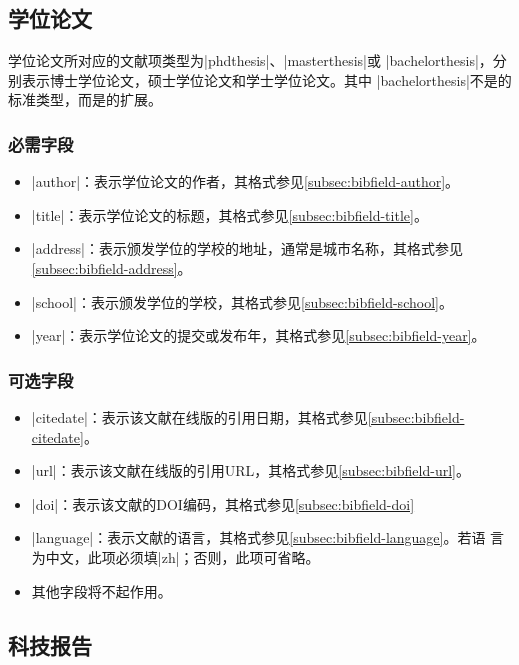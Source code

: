 \subsection{学位论文}\label{subsec:bibtype-thesis}

学位论文所对应的{\BibTeX}文献项类型为|phdthesis|、|masterthesis|或
|bachelorthesis|，分别表示博士学位论文，硕士学位论文和学士学位论文。其中
|bachelorthesis|不是{\BibTeX}的标准类型，而是{\njuthesis}的扩展。

\subsubsection{必需字段}

\begin{itemize}
\item |author|：表示学位论文的作者，其格式参见\ref{subsec:bibfield-author}。
\item |title|：表示学位论文的标题，其格式参见\ref{subsec:bibfield-title}。
\item |address|：表示颁发学位的学校的地址，通常是城市名称，其格式参见\ref{subsec:bibfield-address}。
\item |school|：表示颁发学位的学校，其格式参见\ref{subsec:bibfield-school}。
\item |year|：表示学位论文的提交或发布年，其格式参见\ref{subsec:bibfield-year}。
\end{itemize}

\subsubsection{可选字段}

\begin{itemize}
\item |citedate|：表示该文献在线版的引用日期，其格式参见\ref{subsec:bibfield-citedate}。
\item |url|：表示该文献在线版的引用URL，其格式参见\ref{subsec:bibfield-url}。
\item |doi|：表示该文献的DOI编码，其格式参见\ref{subsec:bibfield-doi}
\item |language|：表示文献的语言，其格式参见\ref{subsec:bibfield-language}。若语
  言为中文，此项必须填|zh|；否则，此项可省略。
\item 其他字段将不起作用。
\end{itemize}

\subsection{科技报告}\label{subsec:bibtype-techreport}

